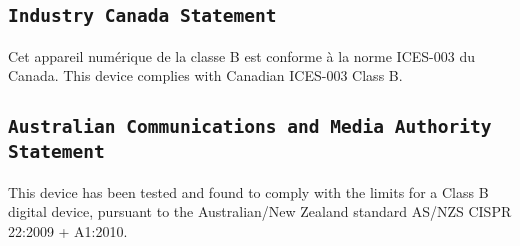 \subsection{\texttt{Industry Canada Statement}}
Cet appareil numérique de la classe B est conforme à la norme ICES-003 du Canada.
This device complies with Canadian ICES-003 Class B.

\subsection{\texttt{Australian Communications and Media Authority Statement}}
This device has been tested and found to comply with the limits for a Class B digital device, pursuant to the Australian/New Zealand standard AS/NZS CISPR 22:2009 + A1:2010.

